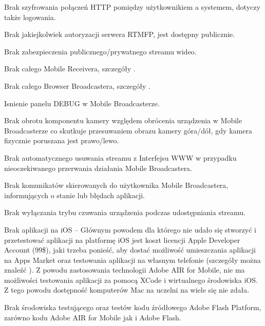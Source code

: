 \begin{packed_item}
    \item{Brak szyfrowania połączeń HTTP pomiędzy użytkownikiem a systemem, dotyczy także logowania.}
    \item{Brak jakiejkolwiek autoryzacji serwera RTMFP, jest dostępny publicznie.}
    \item{Brak zabezpieczenia publicznego/prywatnego streamu wideo.}
    \item{Brak całego Mobile Receivera, szczegóły .}
    \item{Brak całego Browser Broadcastera, szczegóły .}
    \item{Isnienie panelu DEBUG w Mobile Broadcasterze.}
    \item{Brak obrotu komponentu kamery względem obrócenia urządzenia w Mobile Broadcasterze co skutkuje przesuwaniem obrazu kamery góra/dół, gdy kamera fizycznie poruszana jest prawo/lewo.}
    \item{Brak automatycznego usuwania streamu z Interfejsu WWW w przypadku nieoczekiwanego przerwania działania Mobile Broadcastera.}
    \item{Brak komunikatów skierowanych do użytkownika Mobile Broadcastera, informujących o stanie lub błędach aplikacji.}
    \item{Brak wyłączania trybu czuwania urządzenia podczas udostępniania streamu.}
    \item{Brak aplikacji na iOS -- Głównym powodem dla którego nie udało się stworzyć i przetestować aplikacji na platformę iOS jest koszt licencji Apple Developer Account (99\$), jaki trzeba ponieść, aby dostać możliwość umieszczania aplikacji na Apps Market oraz testowania aplikacji na własnym telefonie (szczegóły można znaleźć \cite{UnknAuth11}). Z powodu zastosowania technologii Adobe AIR for Mobile, nie ma możliwości testowania aplikacji za pomocą XCode i wirtualnego środowiska iOS. Z tego powodu dostępność komputerów Mac na uczelni na wiele się nie zdała.}
    \item{Brak środowiska testującego oraz testów kodu źródłowego Adobe Flash Platform, zarówno kodu Adobe AIR for Mobile jak i Adobe Flash.}
\end{packed_item}

\newpage
